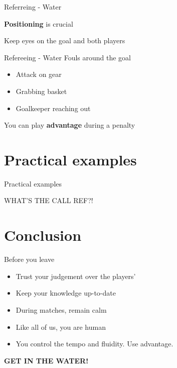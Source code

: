 \documentclass{beamer}
\begin{document}
	\begin{frame}{Referreing - Water}
		\begin{center}
			\textbf{Positioning} is crucial \pause

			Keep eyes on the goal and both players
		\end{center}
	\end{frame}

	\begin{frame}{Refereeing - Water}
		Fouls around the goal
		\begin{itemize}
			\item Attack on gear
			\item Grabbing basket
			\item Goalkeeper reaching out
		\end{itemize}

		\pause

		You can play \textbf{advantage} during a penalty
	\end{frame}

	\section{Practical examples}

	\begin{frame}{Practical examples}
		\begin{center}
			\uppercase{What's the call ref?!}
		\end{center}
	\end{frame}

	\section{Conclusion}

	\begin{frame}{Before you leave}
		\pause
		\begin{itemize}
			\item Trust your judgement over the players' \pause
			\item Keep your knowledge up-to-date \pause
			\item During matches, remain calm \pause
			\item Like all of us, you are human \pause
			\item You control the tempo and fluidity. Use advantage.
		\end{itemize}

		 \pause

		\begin{center}
			\textbf{\uppercase{Get in the water!}}
		\end{center}
	\end{frame}
\end{document}
